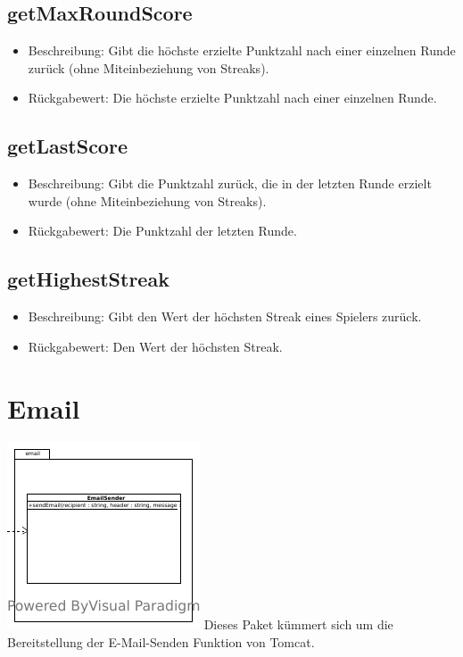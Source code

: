 \documentclass[a4paper]{scrreprt}
\begin{document}
	\subsection{getMaxRoundScore}
	\begin{itemize}
		\item Beschreibung: Gibt die höchste erzielte Punktzahl nach einer einzelnen Runde zurück (ohne Miteinbeziehung von Streaks).
		\item Rückgabewert: Die höchste erzielte Punktzahl nach einer einzelnen Runde.
	\end{itemize}
	\subsection{getLastScore}
	\begin{itemize}
		\item Beschreibung: Gibt die Punktzahl zurück, die in der letzten Runde erzielt wurde (ohne Miteinbeziehung von Streaks).
		\item Rückgabewert: Die Punktzahl der letzten Runde.
	\end{itemize}
	\subsection{getHighestStreak}
	\begin{itemize}
		\item Beschreibung: Gibt den Wert der höchsten Streak eines Spielers zurück.
		\item Rückgabewert: Den Wert der höchsten Streak.
	\end{itemize}

	\section{Email}
	\includegraphics[width=\textwidth]{img/package/email.pdf}
	Dieses Paket kümmert sich um die Bereitstellung der E-Mail-Senden Funktion von Tomcat.
\end{document}
